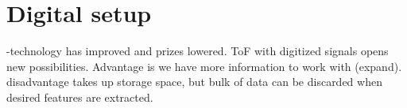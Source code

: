 \documentclass[main.tex]{subfiles}
\begin{document}
\section{Digital setup}
-technology has improved and prizes lowered. ToF with digitized signals opens new possibilities. Advantage is we have more information to work with (expand). disadvantage takes up storage space, but bulk of data can be discarded when desired features are extracted.
\end{document}
